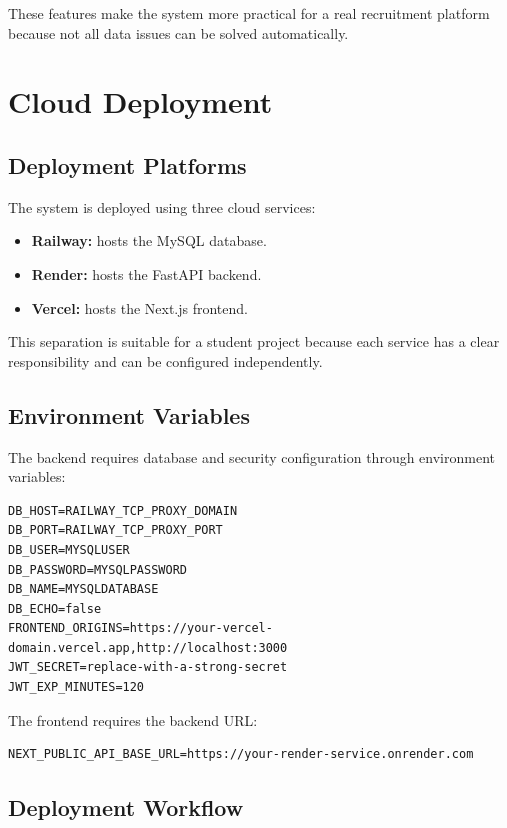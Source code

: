 \documentclass[12pt,a4paper]{report}
\begin{document}
These features make the system more practical for a real recruitment platform because not all data issues can be solved automatically.

\chapter{Cloud Deployment}

\section{Deployment Platforms}

The system is deployed using three cloud services:

\begin{itemize}[leftmargin=1.5cm]
  \item \textbf{Railway:} hosts the MySQL database.
  \item \textbf{Render:} hosts the FastAPI backend.
  \item \textbf{Vercel:} hosts the Next.js frontend.
\end{itemize}

This separation is suitable for a student project because each service has a clear responsibility and can be configured independently.

\section{Environment Variables}

The backend requires database and security configuration through environment variables:

\begin{lstlisting}[caption={Backend environment variables}]
DB_HOST=RAILWAY_TCP_PROXY_DOMAIN
DB_PORT=RAILWAY_TCP_PROXY_PORT
DB_USER=MYSQLUSER
DB_PASSWORD=MYSQLPASSWORD
DB_NAME=MYSQLDATABASE
DB_ECHO=false
FRONTEND_ORIGINS=https://your-vercel-domain.vercel.app,http://localhost:3000
JWT_SECRET=replace-with-a-strong-secret
JWT_EXP_MINUTES=120
\end{lstlisting}

The frontend requires the backend URL:

\begin{lstlisting}[caption={Frontend environment variable}]
NEXT_PUBLIC_API_BASE_URL=https://your-render-service.onrender.com
\end{lstlisting}

\section{Deployment Workflow}
\end{document}
